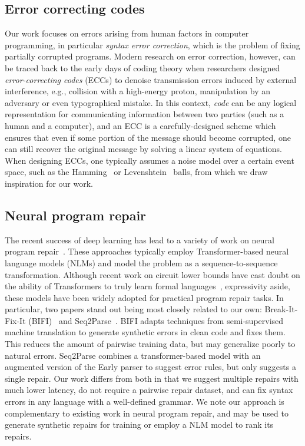 \documentclass[sigplan,review,anonymous,acmsmall]{acmart}\settopmatter{printfolios=false,printccs=false,printacmref=false}
\begin{document}
\subsection{Error correcting codes}

Our work focuses on errors arising from human factors in computer programming, in particular \textit{syntax error correction}, which is the problem of fixing partially corrupted programs. Modern research on error correction, however, can be traced back to the early days of coding theory when researchers designed \textit{error-correcting codes} (ECCs) to denoise transmission errors induced by external interference, e.g., collision with a high-energy proton, manipulation by an adversary or even typographical mistake. In this context, \textit{code} can be any logical representation for communicating information between two parties (such as a human and a computer), and an ECC is a carefully-designed scheme which ensures that even if some portion of the message should become corrupted, one can still recover the original message by solving a linear system of equations. When designing ECCs, one typically assumes a noise model over a certain event space, such as the Hamming~\cite{titsias2017hamming, dong2023number} or Levenshtein~\cite{becerra2008learning, barlev2021levenshtein} balls, from which we draw inspiration for our work.

\subsection{Neural program repair}

The recent success of deep learning has lead to a variety of work on neural program repair~\cite{allamanis2021self, chirkova2021empirical, drain2021generating}. These approaches typically employ Transformer-based neural language models (NLMs) and model the problem as a sequence-to-sequence transformation. Although recent work on circuit lower bounds have cast doubt on the ability of Transformers to truly learn formal languages~\cite{merrill2022saturated, chiang2023tighter}, expressivity aside, these models have been widely adopted for practical program repair tasks. In particular, two papers stand out being most closely related to our own: Break-It-Fix-It (BIFI)~\cite{yasunaga2021break} and Seq2Parse~\cite{sakkas2022seq2parse}. BIFI adapts techniques from semi-supervised machine translation to generate synthetic errors in clean code and fixes them. This reduces the amount of pairwise training data, but may generalize poorly to natural errors. Seq2Parse combines a transformer-based model with an augmented version of the Early parser to suggest error rules, but only suggests a single repair. Our work differs from both in that we suggest multiple repairs with much lower latency, do not require a pairwise repair dataset, and can fix syntax errors in any language with a well-defined grammar. We note our approach is complementary to existing work in neural program repair, and may be used to generate synthetic repairs for training or employ a NLM model to rank its repairs.
\end{document}
